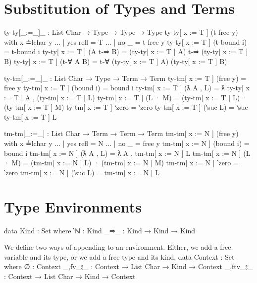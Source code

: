 \documentclass[logo,bsc,singlespacing,parskip,online]{infthesis}
\renewenvironment{code}{\mintedcopy[breaklines,breaksymbolleft=\;]{agda}}{\endmintedcopy}
\begin{document}
\section{Substitution of Types and Terms}
\begin{code}
  ty-ty[_:=_]_ : List Char → Type → Type → Type
  ty-ty[ x := T ] (t-free y) with x ≟lchar y
  ... | yes refl = T
  ... | no  _    = t-free y
  ty-ty[ x := T ] (t-bound i) = t-bound i
  ty-ty[ x := T ] (A t-⇒ B) = (ty-ty[ x := T ] A) t-⇒ (ty-ty[ x := T ] B)
  ty-ty[ x := T ] (t-∀ A B) = t-∀ (ty-ty[ x := T ] A) (ty-ty[ x := T ] B)

  ty-tm[_:=_]_ : List Char → Type → Term → Term
  ty-tm[ x := T ] (free y) = free y
  ty-tm[ x := T ] (bound i) = bound i
  ty-tm[ x := T ] (ƛ A , L) = ƛ ty-ty[ x := T ] A , (ty-tm[ x := T ] L) 
  ty-tm[ x := T ] (L · M) = (ty-tm[ x := T ] L) · (ty-tm[ x := T ] M)
  ty-tm[ x := T ] ‵zero = ‵zero
  ty-tm[ x := T ] (‵suc L) = ‵suc ty-tm[ x := T ] L

  tm-tm[_:=_] : List Char → Term → Term → Term
  tm-tm[ x := N ] (free y) with x ≟lchar y
  ... | yes refl = N
  ... | no  _    = free y
  tm-tm[ x := N ] (bound i) = bound i
  tm-tm[ x := N ] (ƛ A , L) = ƛ A , tm-tm[ x := N ] L
  tm-tm[ x := N ] (L · M) = (tm-tm[ x := N ] L) · (tm-tm[ x := N ] M)
  tm-tm[ x := N ] ‵zero = ‵zero
  tm-tm[ x := N ] (‵suc L) = tm-tm[ x := N ] L
\end{code}

\section{Type Environments}
\begin{code}
  data Kind : Set where
    ‵ℕ : Kind
    _⇒_ : Kind → Kind → Kind
\end{code}

We define two ways of appending to an environment.  Either, we add a free variable and its type, or
we add a free type and its kind.
\begin{code}
  data Context : Set where
    ∅ : Context
    _,fv_⦂_ : Context → List Char → Kind → Context
    _,ftv_⦂_ : Context → List Char → Kind → Context
\end{code}
\end{document}
